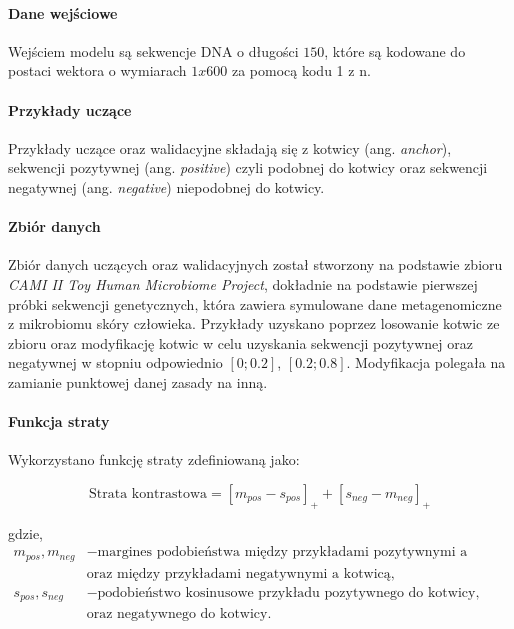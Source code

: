             \paragraph{Dane wejściowe}
                Wejściem modelu są sekwencje DNA o długości $150$, które są kodowane do postaci wektora o wymiarach $1x600$ za pomocą kodu 1 z n\cite{Kod1zN}.

            \paragraph{Przykłady uczące}
                Przykłady uczące oraz walidacyjne składają się z kotwicy (ang. \textit{anchor}), sekwencji pozytywnej (ang. \textit{positive}) czyli podobnej do kotwicy oraz sekwencji negatywnej (ang. \textit{negative}) niepodobnej do kotwicy.
            
            \paragraph{Zbiór danych}
                Zbiór danych uczących oraz walidacyjnych został stworzony na podstawie zbioru \textit{CAMI II Toy Human Microbiome Project}\cite{Fritz2019}, dokładnie na podstawie pierwszej próbki sekwencji genetycznych, która zawiera symulowane dane metagenomiczne z mikrobiomu skóry człowieka. Przykłady uzyskano poprzez losowanie kotwic ze zbioru oraz modyfikację kotwic w celu uzyskania sekwencji pozytywnej oraz negatywnej w stopniu odpowiednio $[0; 0.2]$, $[0.2; 0.8]$. Modyfikacja polegała na zamianie punktowej danej zasady na inną.

            \paragraph{Funkcja straty}
                Wykorzystano funkcję straty zdefiniowaną jako:

                \begin{equation}
                    \text{Strata kontrastowa} = [m_{pos} - s_{pos}]_{+} + [s_{neg} - m_{neg}]_{+}
                \end{equation}

                gdzie,
                \begin{align*}
                    m_{pos}, m_{neg} &- \text{margines podobieństwa między przykładami pozytywnymi a kotwicą,} \\
                    &\text{oraz między przykładami negatywnymi a kotwicą}, \\
                    s_{pos}, s_{neg} &- \text{podobieństwo kosinusowe przykładu pozytywnego do kotwicy,} \\
                    &\text{oraz negatywnego do kotwicy.}
                \end{align*}

